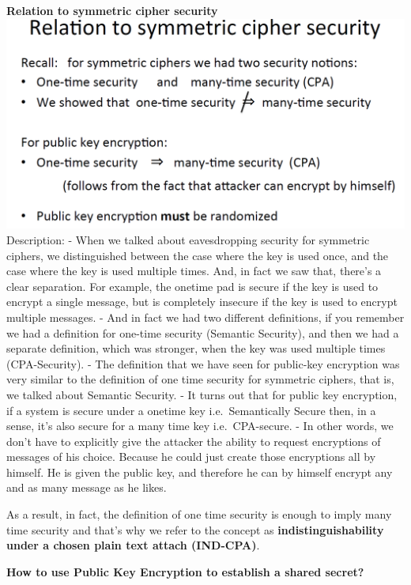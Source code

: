 \documentclass[11pt]{article}
\makeatletter
\def\maxwidth{\ifdim\Gin@nat@width>\linewidth\linewidth
    \else\Gin@nat@width\fi}
\let\Oldincludegraphics\includegraphics
\renewcommand{\includegraphics}[1]{\Oldincludegraphics[width=.8\maxwidth]{#1}}
\makeatother
\begin{document}
\textbf{Relation to symmetric cipher security}
\includegraphics{./Images/PKEnc-SymmetricRelation.png} Description: -
When we talked about eavesdropping security for symmetric ciphers, we
distinguished between the case where the key is used once, and the case
where the key is used multiple times. And, in fact we saw that, there's
a clear separation. For example, the onetime pad is secure if the key is
used to encrypt a single message, but is completely insecure if the key
is used to encrypt multiple messages. - And in fact we had two different
definitions, if you remember we had a definition for one-time security
(Semantic Security), and then we had a separate definition, which was
stronger, when the key was used multiple times (CPA-Security). - The
definition that we have seen for public-key encryption was very similar
to the definition of one time security for symmetric ciphers, that is,
we talked about Semantic Security. - It turns out that for public key
encryption, if a system is secure under a onetime key i.e.~Semantically
Secure then, in a sense, it's also secure for a many time key
i.e.~CPA-secure. - In other words, we don't have to explicitly give the
attacker the ability to request encryptions of messages of his choice.
Because he could just create those encryptions all by himself. He is
given the public key, and therefore he can by himself encrypt any and as
many message as he likes.

As a result, in fact, the definition of one time security is enough to
imply many time security and that's why we refer to the concept as
\textbf{indistinguishability under a chosen plain text attach
(IND-CPA)}.

\textbf{How to use Public Key Encryption to establish a shared secret?}
\end{document}
